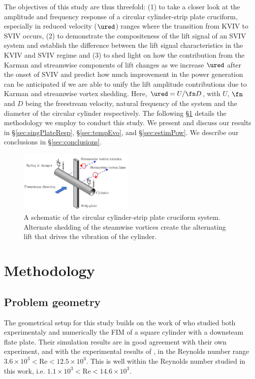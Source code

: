 \documentclass[a4paper,fleqn]{cas-sc}
\begin{document}
The objectives of this study are thus threefold: (1) to take a closer look at the amplitude and frequency response of a circular cylinder-strip plate cruciform, especially in reduced velocity ($\ured$) ranges where the transition from KVIV to SVIV occurs, (2) to demonstrate the compositeness of the lift signal of an SVIV system and establish the difference between the lift signal characteristics in the KVIV and SVIV regime and (3) to shed light on how the contribution from the Karman and streamwise components of lift changes as we increase $\ured$ after the onset of SVIV and predict how much improvement in the power generation can be anticipated if we are able to unify the lift amplitude contributions due to Karman and streamwise vortex shedding. Here, $\ured = U/\fn D$, with $U$, $\fn$ and $D$ being the freestream velocity, natural frequency of the system and the diameter of the circular cylinder respectively. The following \S\ref{sec:method} details the methodology we employ to conduct this study. We present and discuss our results in \S\ref{sec:singPlateResp}, \S\ref{sec:tempEvo}, and \S\ref{sec:estimPow}. We describe our conclusions in \S\ref{sec:conclusions}.

\begin{figure}
  \centering
  \includegraphics[width=0.5\textwidth]{figs/figure1}
  \caption{A schematic of the circular cylinder-strip plate cruciform system. Alternate shedding of the steamwise vortices create the alternating lift that drives the vibration of the cylinder.}
  \label{fig:cruciformSystemSchematic}
\end{figure}

\section{Methodology} \label{sec:method}
\subsection{Problem geometry} \label{ssec:probGeo}
The geometrical setup for this study builds on the work of \citet{Maruai2017,Maruai2018} who studied both experimentaly and numerically the FIM of a square cylinder with a downsteam flate plate. Their simulation results are in good agreement with their own experiment, and with the experimental results of \citet{Kawabata2013}, in the Reynolds number range $3.6\times10^{3}<\text{Re}<12.5\times10^{3}$. This is well within the Reynolds number studied in this work, i.e. $1.1\times10^{3}<\text{Re}<14.6\times10^{3}$.
\end{document}
